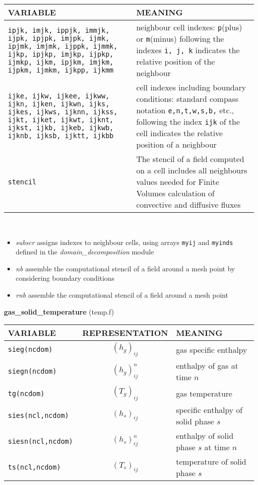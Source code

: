 \begin{tabular}{|p{6cm}|p{6cm}|}\hline
VARIABLE & MEANING \\ \hline
\tt ipjk, imjk, ippjk, immjk, ijpk, ipjpk, imjpk, ijmk, ipjmk, imjmk, ijppk, ijmmk, ijkp, ipjkp, imjkp, ijpkp, ijmkp, ijkm, ipjkm, imjkm, ijpkm, ijmkm, ijkpp, ijkmm & neighbour cell indexes: {\tt p}(plus) or {\tt m}(minus) following the indexes {\tt i, j, k} indicates the relative position of the neighbour\\\hline
\tt ijke, ijkw, ijkee, ijkww, ijkn, ijken, ijkwn, ijks, ijkes, ijkws, ijknn, ijkss, ijkt, ijket, ijkwt, ijknt, ijkst, ijkb, ijkeb, ijkwb, ijknb, ijksb, ijktt, ijkbb & cell indexes including boundary conditions: standard compass notation {\tt e,n,t,w,s,b,} etc., following the index {\tt ijk} of the cell indicates the relative position of a neighbour \\\hline
\tt stencil & The stencil of a field computed on a cell includes all neighbours values needed for Finite Volumes calculation of convective and diffusive fluxes \\\hline
\end{tabular}\\
\begin{itemize}
\item{\em subscr} assigns indexes to neighbour cells, using arrays {\tt myij} and {\tt myinds} defined in the {\em domain\_decomposition} module\\
\item{\em nb} assemble the computational stencil of a field around a mesh point by considering boundary conditions
\item{\em rnb} assemble the computational stencil of a field around a mesh point
\end{itemize}
%
%
{\large {\bf gas\_solid\_temperature}} (temp.f)\\[5mm]
\begin{tabular}{|p{6cm}|c|p{6cm}|}\hline
VARIABLE & REPRESENTATION & MEANING\\\hline
\tt sieg(ncdom) & $(h_g)_{ij}$ &  gas specific enthalpy \\\hline 
\tt siegn(ncdom) & $(h_g)^{n}_{ij}$ &  enthalpy of gas at time $n$\\\hline
\tt tg(ncdom) & $(T_g)_{ij}$ &  gas temperature\\\hline
\tt sies(ncl,ncdom) & $(h_s)_{ij}$ &  specific enthalpy of solid phase $s$ \\\hline
\tt siesn(ncl,ncdom) & $(h_s)^{n}_{ij}$ &  enthalpy of solid phase $s$ at time $n$\\\hline
\tt ts(ncl,ncdom) & $(T_s)_{ij}$ &  temperature of solid phase $s$\\\hline
\end{tabular}\\[5mm]
